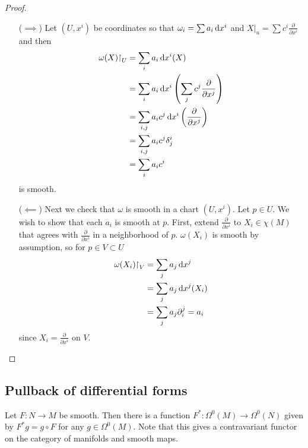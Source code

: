 \begin{proof}
  \begin{itemize}
    \item[($\implies$)]{
      Let $(U, x^i)$ be coordinates so that
      $\omega_i = \sum a_i \mathop{}\!\mathrm{d} x^i$ and
      $X|_u = \sum c^i \frac{\partial}{\partial x^i}$
      and then
      \begin{align*}
         \omega(X)\mathord{\upharpoonright}_U
      &= \sum_i a_i \mathop{}\!\mathrm{d} x^i (X) \\
      &= \sum_i
           a_i \mathop{}\!\mathrm{d} x^i
           \left(
             \sum_j
               c^j \frac{\partial}{\partial x^j}
           \right) \\
      &= \sum_{i,j}
           a_i c^j \mathop{}\!\mathrm{d} x^i
           \left(
             \frac{\partial}{\partial x^j}
           \right) \\
      &= \sum_{i, j}
           a_i c^j \delta^i_j \\
      &= \sum_i
           a_i c^i
      \end{align*}
      is smooth.
    }
    \item[($\impliedby$)]{
      Next we check that $\omega$ is smooth in a chart
      $(U, x^i)$.
      Let $p \in U$. We wish to show that each
      $a_i$ is smooth at $p$.
      First, extend $\frac{\partial}{\partial x^i}$ to
      $X_i \in \chi(M)$ that agrees with $\frac{\partial}{\partial
        x^i}$ in a neighborhood of $p$.
      $\omega(X_i)$ is smooth by assumption, so for $p \in V \subset U$
      \begin{align*}
         \omega(X_i)\mathord{\upharpoonright}_V
      &= \sum_j
           a_j \mathop{}\!\mathrm{d} x^j \\
      &= \sum_j
           a_j \mathop{}\!\mathrm{d} x^j(X_i) \\
      &= \sum_j
           a_j \partial^j_i
       = a_i
      \end{align*}
      since $X_i = \frac{\partial}{\partial x^i}$ on $V$.
    }
  \end{itemize}
\end{proof}

\subsection{Pullback of differential forms}
Let $F: N \to M$ be smooth. Then there is a function
$F^\ast : \Omega^0(M) \to \Omega^0(N)$ given by
$F^\ast g = g \circ F$ for any $g \in \Omega^0(M)$.
Note that this gives a contravariant functor on
the category of manifolds and smooth maps.

